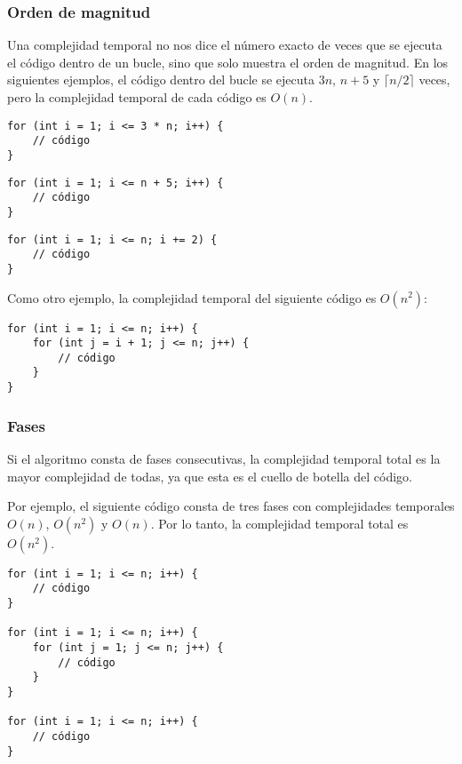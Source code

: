 \subsubsection*{Orden de magnitud}

Una complejidad temporal no nos dice el número exacto
de veces que se ejecuta el código dentro de un bucle,
sino que solo muestra el orden de magnitud.
En los siguientes ejemplos, el código dentro del bucle
se ejecuta $3n$, $n+5$ y $\lceil n/2 \rceil$ veces,
pero la complejidad temporal de cada código es $O(n)$.

\begin{lstlisting}
for (int i = 1; i <= 3 * n; i++) {
    // código
}
\end{lstlisting}

\begin{lstlisting}
for (int i = 1; i <= n + 5; i++) {
    // código
}
\end{lstlisting}

\begin{lstlisting}
for (int i = 1; i <= n; i += 2) {
    // código
}
\end{lstlisting}

Como otro ejemplo,
la complejidad temporal del siguiente código es $O(n^2)$:

\begin{lstlisting}
for (int i = 1; i <= n; i++) {
    for (int j = i + 1; j <= n; j++) {
        // código
    }
}
\end{lstlisting}

\subsubsection*{Fases}

Si el algoritmo consta de fases consecutivas,
la complejidad temporal total es la mayor
complejidad de todas, ya que esta
es el cuello de botella del código.

Por ejemplo, el siguiente código consta
de tres fases con complejidades temporales
$O(n)$, $O(n^2)$ y $O(n)$.
Por lo tanto, la complejidad temporal total es $O(n^2)$.

\begin{lstlisting}
for (int i = 1; i <= n; i++) {
    // código
}

for (int i = 1; i <= n; i++) {
    for (int j = 1; j <= n; j++) {
        // código
    }
}

for (int i = 1; i <= n; i++) {
    // código
}
\end{lstlisting}

